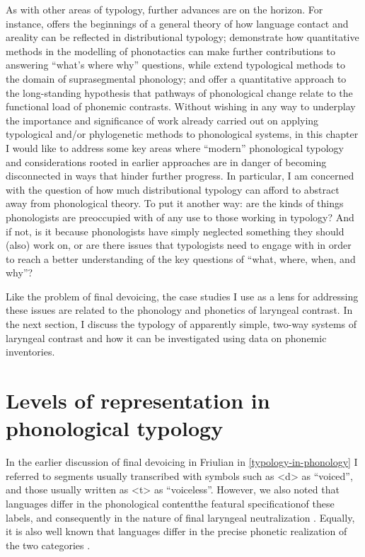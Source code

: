 \documentclass[output=paper,colorlinks,citecolor=brown]{langscibook}
\begin{document}
As with other areas of typology, further advances are on the horizon. For instance,  \textcite{Nikolaev2019} offers the beginnings of a general theory of how language contact and areality can be reflected in distributional typology; \textcite{MacklinCordes2021} demonstrate how quantitative methods in the modelling of phonotactics can make further contributions to answering \enquote{what's where why} questions, while \textcite{napoleão2023beyond} extend typological methods to the domain of suprasegmental phonology; and \textcite{round2021historical} offer a quantitative approach to the long\hyp standing hypothesis that pathways of phonological change relate to the functional load of phonemic contrasts. Without wishing in any way to underplay the importance and significance of work already carried out on applying typological and/or phylogenetic methods to phonological systems, in this chapter I would like to address some key areas where \enquote{modern} phonological typology and considerations rooted in earlier approaches are in danger of becoming disconnected in ways that hinder further progress. In particular, I am concerned with the question of how much distributional typology can afford to abstract away from phonological theory. To put it another way: are the kinds of things phonologists are preoccupied with of any use to those working in typology? And if not, is it because phonologists have simply neglected something they should (also) work on, or are there issues that typologists need to engage with in order to reach a better understanding of the key questions of \enquote{what, where, when, and why}?

Like the problem of final devoicing, the case studies I use as a lens for addressing these issues are related to the phonology and phonetics of laryngeal contrast. In the next section, I discuss the typology of apparently simple, two\hyp way systems of laryngeal contrast and how it can be investigated using data on phonemic inventories.


\section{Levels of representation in phonological typology}
\label{sec:levels-representation}

In the earlier discussion of final devoicing in Friulian in \cref{typology-in-phonology} I referred to segments usually transcribed with symbols such as <d> as \enquote{voiced}, and those usually written as <t> as \enquote{voiceless}. However, we also noted that languages differ in the phonological content\dash the featural specification\dash of these labels, and consequently in the nature of final laryngeal neutralization \parencite{vaux05, iverson11:_final}. Equally, it is also well known that languages differ in the precise phonetic realization of the two categories \parencite[see, for instance][]{petrova06:_voice, chodroff2019covariation}. 
\end{document}
